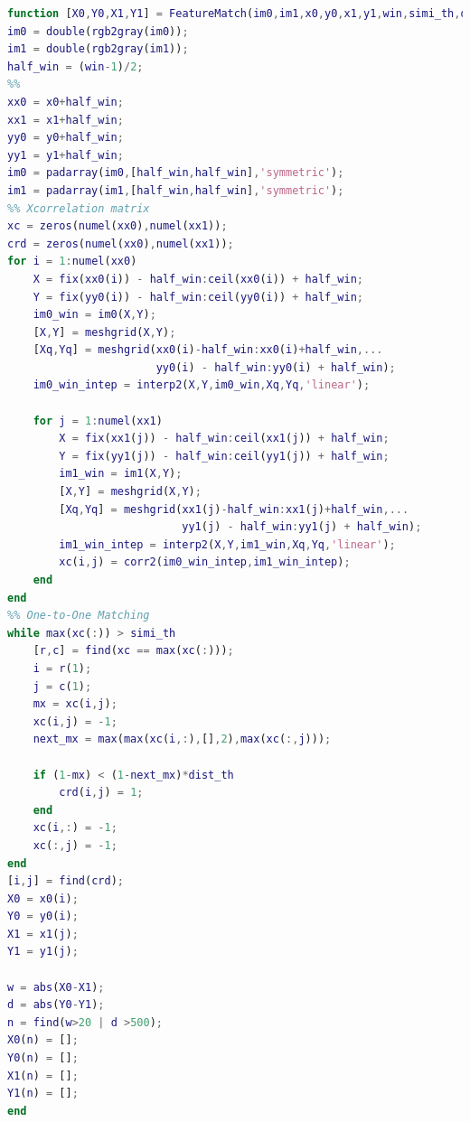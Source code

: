 \documentclass{assignment}
\begin{document}
\begin{lstlisting}[language=MATLAB]
function [X0,Y0,X1,Y1] = FeatureMatch(im0,im1,x0,y0,x1,y1,win,simi_th,dist_th)
im0 = double(rgb2gray(im0));
im1 = double(rgb2gray(im1));
half_win = (win-1)/2;
%%
xx0 = x0+half_win;
xx1 = x1+half_win;
yy0 = y0+half_win;
yy1 = y1+half_win;
im0 = padarray(im0,[half_win,half_win],'symmetric');
im1 = padarray(im1,[half_win,half_win],'symmetric');
%% Xcorrelation matrix
xc = zeros(numel(xx0),numel(xx1));
crd = zeros(numel(xx0),numel(xx1));
for i = 1:numel(xx0)
    X = fix(xx0(i)) - half_win:ceil(xx0(i)) + half_win;
    Y = fix(yy0(i)) - half_win:ceil(yy0(i)) + half_win;
    im0_win = im0(X,Y);
    [X,Y] = meshgrid(X,Y);
    [Xq,Yq] = meshgrid(xx0(i)-half_win:xx0(i)+half_win,...
                       yy0(i) - half_win:yy0(i) + half_win);
    im0_win_intep = interp2(X,Y,im0_win,Xq,Yq,'linear');    

    for j = 1:numel(xx1)
        X = fix(xx1(j)) - half_win:ceil(xx1(j)) + half_win;
        Y = fix(yy1(j)) - half_win:ceil(yy1(j)) + half_win;
        im1_win = im1(X,Y);
        [X,Y] = meshgrid(X,Y);
        [Xq,Yq] = meshgrid(xx1(j)-half_win:xx1(j)+half_win,...
                           yy1(j) - half_win:yy1(j) + half_win);
        im1_win_intep = interp2(X,Y,im1_win,Xq,Yq,'linear');
        xc(i,j) = corr2(im0_win_intep,im1_win_intep);
    end
end
%% One-to-One Matching
while max(xc(:)) > simi_th
    [r,c] = find(xc == max(xc(:)));
    i = r(1);
    j = c(1);
    mx = xc(i,j);
    xc(i,j) = -1;
    next_mx = max(max(xc(i,:),[],2),max(xc(:,j)));
    
    if (1-mx) < (1-next_mx)*dist_th
        crd(i,j) = 1;
    end
    xc(i,:) = -1;
    xc(:,j) = -1;
end
[i,j] = find(crd);
X0 = x0(i);
Y0 = y0(i);
X1 = x1(j);
Y1 = y1(j);

w = abs(X0-X1);
d = abs(Y0-Y1);
n = find(w>20 | d >500);
X0(n) = [];
Y0(n) = [];
X1(n) = [];
Y1(n) = [];
end
\end{lstlisting}
\end{document}
